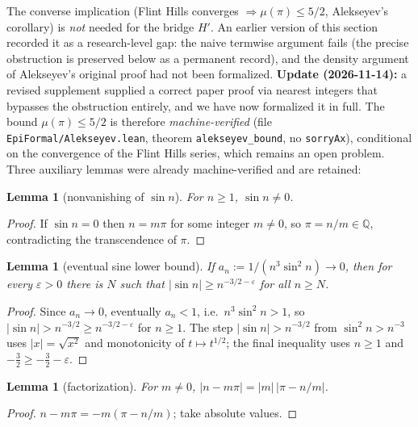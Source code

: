 \documentclass[11pt]{amsart}
\newtheorem{lemma}[theorem]{Lemma}
\theoremstyle{definition}
\theoremstyle{remark}
\numberwithin{equation}{section}
\newcommand{\Q}{\mathbb{Q}}
\newcommand{\irr}{\mu}
\begin{document}
The converse implication (Flint Hills converges $\Rightarrow\irr(\pi)\le5/2$, Alekseyev's corollary) is \emph{not} needed for the bridge $H'$. An earlier version of this section recorded it as a research-level gap: the naive termwise argument fails (the precise obstruction is preserved below as a permanent record), and the density argument of Alekseyev's original proof had not been formalized. \textbf{Update (2026-11-14):} a revised supplement supplied a correct paper proof via nearest integers that bypasses the obstruction entirely, and we have now formalized it in full. The bound $\irr(\pi)\le5/2$ is therefore \emph{machine-verified} (file \texttt{EpiFormal/\allowbreak{}Alekseyev.lean}, theorem \texttt{alekseyev\_\allowbreak{}bound}, no \texttt{sorryAx}), conditional on the convergence of the Flint Hills series, which remains an open problem. Three auxiliary lemmas were already machine-verified and are retained:

\begin{lemma}[nonvanishing of $\sin n$] For $n\ge1$, $\sin n\ne0$.
\end{lemma}
\begin{proof} If $\sin n=0$ then $n=m\pi$ for some integer $m\ne0$, so $\pi=n/m\in\Q$, contradicting the transcendence of $\pi$.
\end{proof}

\begin{lemma}[eventual sine lower bound]\label{lem:sin-lower} If $a_n:=1/(n^3\sin^2 n)\to0$, then for every $\varepsilon>0$ there is $N$ such that $|\sin n|\ge n^{-3/2-\varepsilon}$ for all $n\ge N$.
\end{lemma}
\begin{proof} Since $a_n\to0$, eventually $a_n<1$, i.e.\ $n^3\sin^2 n>1$, so $|\sin n|>n^{-3/2}\ge n^{-3/2-\varepsilon}$ for $n\ge1$. The step $|\sin n|>n^{-3/2}$ from $\sin^2 n>n^{-3}$ uses $|x|=\sqrt{x^2}$ and monotonicity of $t\mapsto t^{1/2}$; the final inequality uses $n\ge1$ and $-\tfrac32\ge-\tfrac32-\varepsilon$.
\end{proof}

\begin{lemma}[factorization] For $m\ne0$, $|n-m\pi|=|m|\,|\pi-n/m|$.
\end{lemma}
\begin{proof} $n-m\pi=-m(\pi-n/m)$; take absolute values.
\end{proof}
\end{document}
